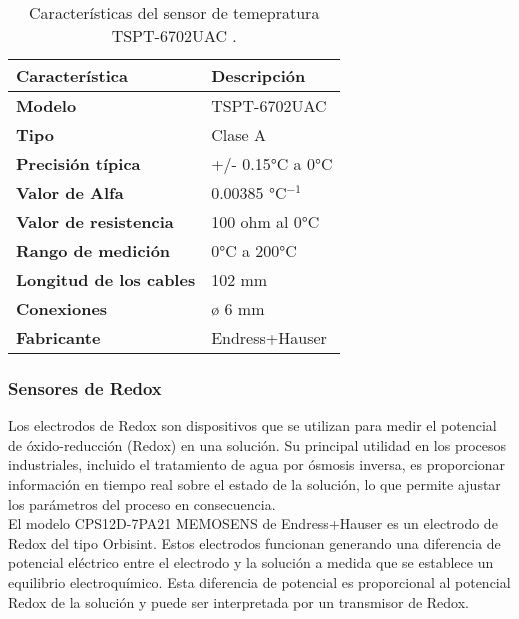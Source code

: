 \begin{table}[H]
    \centering
    \caption{Características del sensor de temepratura TSPT-6702UAC .}
    \label{table:sensor_temperatura}
    \begin{tabular}{| L{6cm} | L{6cm} |}
        \hline
        \textbf{Característica} & \textbf{Descripción}  \\
        \hline
        \textbf{Modelo} & TSPT-6702UAC  \\
        \hline
        \textbf{Tipo} & Clase A  \\
        \hline
        \textbf{Precisión típica} & +/- 0.15°C a 0°C  \\
        \hline
        \textbf{Valor de Alfa} & 0.00385 °C$^{-1}$ \\
        \hline
        \textbf{Valor de resistencia} & 100 ohm al 0°C  \\
        \hline
        \textbf{Rango de medición} & 0°C a 200°C  \\
        \hline
        \textbf{Longitud de los cables} & 102 mm  \\
        \hline
        \textbf{Conexiones} & ø 6 mm  \\
        \hline
        \textbf{Fabricante} & Endress+Hauser  \\
        \hline
    \end{tabular}
\end{table}

\subsubsection{Sensores de Redox} \label{sec:sensor_redox}

Los electrodos de Redox son dispositivos que se utilizan para medir el potencial de óxido-reducción (Redox) en una solución. Su principal utilidad en los procesos industriales, incluido el tratamiento de agua por ósmosis inversa, es proporcionar información en tiempo real sobre el estado de la solución, lo que permite ajustar los parámetros del proceso en consecuencia.\\

El modelo CPS12D-7PA21 MEMOSENS de Endress+Hauser es un electrodo de Redox del tipo Orbisint. Estos electrodos funcionan generando una diferencia de potencial eléctrico entre el electrodo y la solución a medida que se establece un equilibrio electroquímico. Esta diferencia de potencial es proporcional al potencial Redox de la solución y puede ser interpretada por un transmisor de Redox.\\

